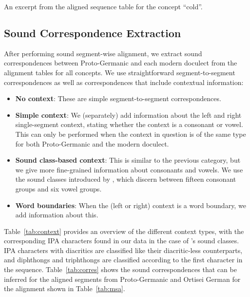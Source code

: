 \documentclass[a4paper]{article}
\begin{document}
\begin{table}[h]
\begin{center}

\end{center}
\caption{An excerpt from the aligned sequence table for the concept ``cold''.}
\label{tab:msa}
\end{table}

\subsection{Sound Correspondence Extraction}
\label{subsec:corres}

After performing sound segment-wise alignment,
we extract sound correspondences between
Proto-Germanic and each modern doculect from the alignment tables for all concepts.
We use straightforward segment-to-segment correspondences
as well as correspondences that include contextual information:

\begin{itemize}
\item
\textbf{No context}:
These are simple segment-to-segment correspondences.

\item
\textbf{Simple context}:
We (separately) add information about the
left and right single-segment context,
stating whether the context is a consonant or vowel. 
This can only be performed when the context in question is of
the same type for both Proto-Germanic and the modern doculect.

\item
\textbf{Sound class-based context}:
This is similar to the previous category,
but we give more fine-grained information about consonants and vowels.
We use the sound classes introduced by \citet{list2012sca},
which discern between fifteen consonant groups and six vowel groups.

\item
\textbf{Word boundaries}:
When the (left or right) context is a word boundary,
we add information about this.

\end{itemize}

Table~\ref{tab:context} provides an overview
of the different context types,
with the corresponding IPA characters found in our data
in the case of \citeauthor{list2012sca}'s sound classes.
IPA characters with diacritics are classified
like their diacritic-less counterparts,
and diphthongs and triphthongs are classified
according to the first character in the sequence.
Table~\ref{tab:corres} shows the sound correspondences
that can be inferred for the aligned segments
from Proto-Germanic and Ortisei German for the alignment
shown in Table~\ref{tab:msa}.
\end{document}
